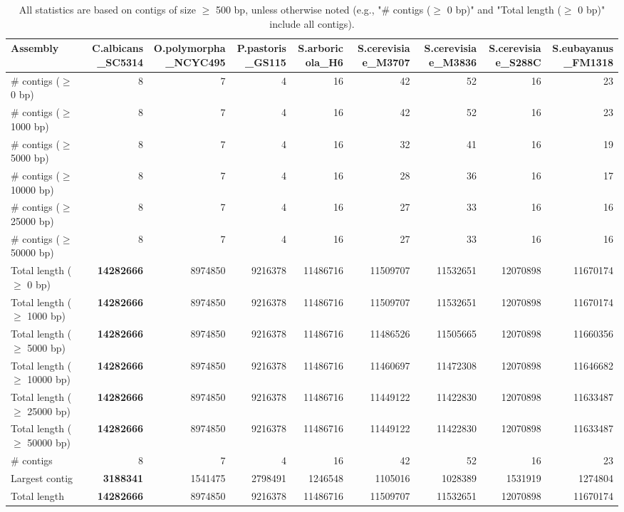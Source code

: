 \documentclass[12pt,a4paper]{article}
\begin{document}
\begin{table}[ht]
\begin{center}
\caption{All statistics are based on contigs of size $\geq$ 500 bp, unless otherwise noted (e.g., "\# contigs ($\geq$ 0 bp)" and "Total length ($\geq$ 0 bp)" include all contigs).}
\begin{tabular}{|l*{8}{|r}|}
\hline
Assembly & C.albicans\_SC5314 & O.polymorpha\_NCYC495 & P.pastoris\_GS115 & S.arboricola\_H6 & S.cerevisiae\_M3707 & S.cerevisiae\_M3836 & S.cerevisiae\_S288C & S.eubayanus\_FM1318 \\ \hline
\# contigs ($\geq$ 0 bp) & 8 & 7 & 4 & 16 & 42 & 52 & 16 & 23 \\ \hline
\# contigs ($\geq$ 1000 bp) & 8 & 7 & 4 & 16 & 42 & 52 & 16 & 23 \\ \hline
\# contigs ($\geq$ 5000 bp) & 8 & 7 & 4 & 16 & 32 & 41 & 16 & 19 \\ \hline
\# contigs ($\geq$ 10000 bp) & 8 & 7 & 4 & 16 & 28 & 36 & 16 & 17 \\ \hline
\# contigs ($\geq$ 25000 bp) & 8 & 7 & 4 & 16 & 27 & 33 & 16 & 16 \\ \hline
\# contigs ($\geq$ 50000 bp) & 8 & 7 & 4 & 16 & 27 & 33 & 16 & 16 \\ \hline
Total length ($\geq$ 0 bp) & {\bf 14282666} & 8974850 & 9216378 & 11486716 & 11509707 & 11532651 & 12070898 & 11670174 \\ \hline
Total length ($\geq$ 1000 bp) & {\bf 14282666} & 8974850 & 9216378 & 11486716 & 11509707 & 11532651 & 12070898 & 11670174 \\ \hline
Total length ($\geq$ 5000 bp) & {\bf 14282666} & 8974850 & 9216378 & 11486716 & 11486526 & 11505665 & 12070898 & 11660356 \\ \hline
Total length ($\geq$ 10000 bp) & {\bf 14282666} & 8974850 & 9216378 & 11486716 & 11460697 & 11472308 & 12070898 & 11646682 \\ \hline
Total length ($\geq$ 25000 bp) & {\bf 14282666} & 8974850 & 9216378 & 11486716 & 11449122 & 11422830 & 12070898 & 11633487 \\ \hline
Total length ($\geq$ 50000 bp) & {\bf 14282666} & 8974850 & 9216378 & 11486716 & 11449122 & 11422830 & 12070898 & 11633487 \\ \hline
\# contigs & 8 & 7 & 4 & 16 & 42 & 52 & 16 & 23 \\ \hline
Largest contig & {\bf 3188341} & 1541475 & 2798491 & 1246548 & 1105016 & 1028389 & 1531919 & 1274804 \\ \hline
Total length & {\bf 14282666} & 8974850 & 9216378 & 11486716 & 11509707 & 11532651 & 12070898 & 11670174 \\ \hline

\end{tabular}
\end{center}
\end{table}
\end{document}
